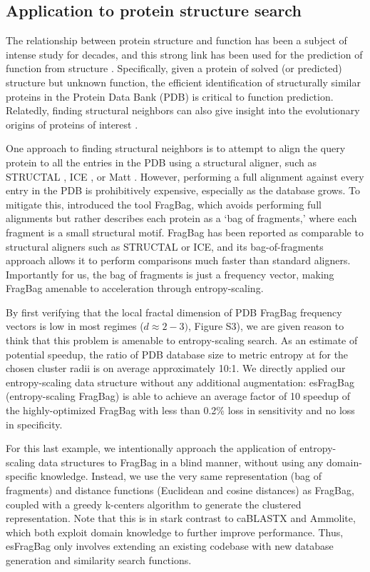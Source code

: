 \documentclass[review,preprint,12pt]{elsarticle}
\renewcommand{\cite}{\citep} %
\theoremstyle{definition}
\theoremstyle{remark}
\numberwithin{equation}{section}
\begin{document}
\subsection{Application to protein structure search}

The relationship between protein structure and function has been a subject of intense study for decades,
and this strong link has been used for the prediction of function from structure \cite{hegyi1999relationship}.
Specifically, given a protein of solved (or predicted) structure but unknown function, the efficient identification
of structurally similar proteins in the Protein Data Bank (PDB) is critical to function prediction.
Relatedly, finding structural neighbors can also give insight into the evolutionary origins of proteins of interest \cite{yona1999protomap,nepomnyachiy2014global}.

One approach to finding structural neighbors is to attempt to align the query protein to all the entries in the PDB using a structural aligner, such as 
STRUCTAL \cite{subbiah1993structural}, ICE \cite{shindyalov1998protein}, or 
Matt \cite{menke2008matt}.
However, performing a full alignment against every entry in the PDB is prohibitively expensive, especially as the database grows.
To mitigate this, \citep{budowski2010fragbag} introduced the tool FragBag, which avoids performing full alignments but rather describes each protein as a
`bag of fragments,' where each fragment is a small structural motif.
FragBag has been reported as comparable to structural aligners such as STRUCTAL or ICE,
and its bag-of-fragments approach
allows it to perform comparisons much faster than standard aligners.
Importantly for us, the bag of fragments is just a frequency vector, making
FragBag amenable to acceleration through entropy-scaling.

By first verifying that the local fractal dimension of PDB FragBag frequency vectors is low in most regimes ($d \approx 2-3)$, Figure S3), we are given reason to think that this problem is amenable to entropy-scaling search.
As an estimate of potential speedup, the ratio of PDB database size to metric 
entropy at for the chosen cluster radii is on average approximately 10:1.
We directly applied our entropy-scaling data structure without any additional 
augmentation: esFragBag (entropy-scaling FragBag) is able to achieve an average
factor of 10 speedup of the highly-optimized FragBag with less than 0.2\% loss 
in sensitivity and no loss in specificity.

For this last example, we intentionally approach the application of entropy-scaling data structures to FragBag in a blind manner,
without using any domain-specific knowledge.
Instead, we use the very same representation (bag of fragments) and distance functions (Euclidean and cosine distances)
as FragBag, coupled with a greedy k-centers algorithm to generate the clustered representation.
Note that this is in stark contrast to caBLASTX and Ammolite, which both exploit domain knowledge to further improve performance.
Thus, esFragBag only involves extending an existing codebase with new database generation and similarity search functions.
\end{document}
